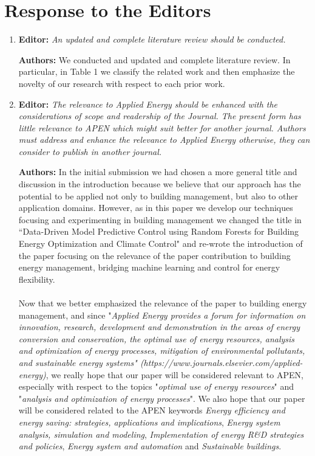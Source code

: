\documentclass{article}
\begin{document}
\section{Response to the Editors}



\begin{enumerate}

	

	\item \textbf{Editor:} \textit{An updated and complete literature review should be conducted.}

		

	\textbf{Authors:} We conducted and updated and complete literature review. In particular, in Table 1 we classify the related work and then emphasize the novelty of our research with respect to each prior work.



	\item \textbf{Editor:} \textit{The relevance to Applied Energy should be enhanced with the considerations of scope and readership of the Journal. The present form has little relevance to APEN which might suit better for another journal. Authors must address and enhance the relevance to Applied Energy otherwise, they can consider to publish in another journal.}

	

	\textbf{Authors:} In the initial submission we had chosen a more general title and discussion in the introduction because we believe that our approach has the potential to be applied not only to building management, but also to other application domains. However, as in this paper we develop our techniques focusing and experimenting in building management we changed the title in ``Data-Driven Model Predictive Control using Random Forests for Building Energy Optimization and Climate Control" and re-wrote the introduction of the paper focusing on the relevance of the paper contribution to building energy management, bridging machine learning and control for energy flexibility.\\\\
	Now that we better emphasized the relevance of the paper to building energy management, and since "\textit{Applied Energy provides a forum for information on innovation, research, development and demonstration in the areas of energy conversion and conservation, the optimal use of energy resources, analysis and optimization of energy processes, mitigation of environmental pollutants, and sustainable energy systems" (https://www.journals.elsevier.com/applied-energy)}, we really hope that our paper will be considered relevant to APEN, especially with respect to the topics "\textit{optimal use of energy resources}" and "\textit{analysis and optimization of energy processes}". We also hope that our paper will be considered related to the APEN keywords \textit{Energy efficiency and energy saving: strategies, applications and implications}, \textit{Energy system analysis, simulation and modeling}, \textit{Implementation of energy R\&D strategies and policies}, \textit{Energy system and automation} and \textit{Sustainable buildings}.



\end{enumerate}
\end{document}

